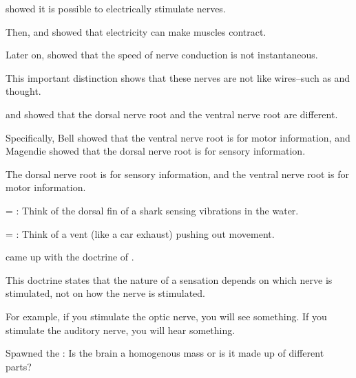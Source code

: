 \begin{coloredlist}
    \item \label{person:newton} showed it is possible to electrically stimulate nerves.
    \item Then, \label{{person:galvani}}  and \label{person:bois-reymond} showed that electricity can make muscles contract.
    \item Later on,  showed that the speed of nerve conduction is not instantaneous.
    \item This important distinction shows that these nerves are not like wires--such as  and  thought.
    \item {} and  showed that the dorsal nerve root and the ventral nerve root are different.
    \begin{coloredlist}
        \item Specifically, Bell showed that the ventral nerve root is for motor information, and Magendie showed that the dorsal nerve root is for sensory information.
    \end{coloredlist}
    \item The dorsal nerve root is for sensory information, and the ventral nerve root is for motor information.
    \item {} = : Think of the dorsal fin of a shark sensing vibrations in the water.
    \item {} = : Think of a vent (like a car exhaust) pushing out movement.
    \item {} came up with the doctrine of .
    \begin{coloredlist}
        \item This doctrine states that the nature of a sensation depends on which nerve is stimulated, not on how the nerve is stimulated.
        \item For example, if you stimulate the optic nerve, you will see something. If you stimulate the auditory nerve, you will hear something.
    \end{coloredlist}
    \item Spawned the : Is the brain a homogenous mass or is it made up of different parts?
\end{coloredlist}

